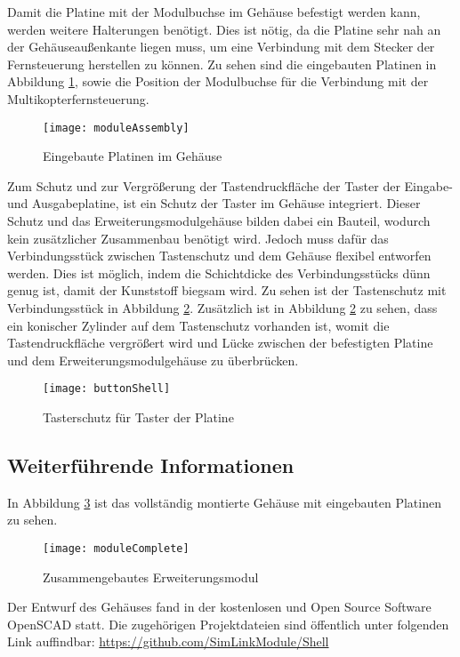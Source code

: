 Damit die Platine mit der Modulbuchse im Gehäuse befestigt werden kann, werden weitere Halterungen benötigt. Dies ist nötig, da die Platine sehr nah an der Gehäuseaußenkante liegen muss, um eine Verbindung mit dem Stecker der Fernsteuerung herstellen zu können. Zu sehen sind die eingebauten Platinen in Abbildung \ref{fig:moduleAssembly}, sowie die Position der Modulbuchse für die Verbindung mit der Multikopterfernsteuerung.

\begin{figure}[h]
    \centering
    \texttt{[image: moduleAssembly]}
    \caption{Eingebaute Platinen im Gehäuse}
    \label{fig:moduleAssembly}
\end{figure}

Zum Schutz und zur Vergrößerung der Tastendruckfläche der Taster der Eingabe- und Ausgabeplatine, ist ein Schutz der Taster im Gehäuse integriert. Dieser Schutz und das Erweiterungsmodulgehäuse bilden dabei ein Bauteil, wodurch kein zusätzlicher Zusammenbau benötigt wird. Jedoch muss dafür das Verbindungsstück zwischen Tastenschutz und dem Gehäuse flexibel entworfen werden. Dies ist möglich, indem die Schichtdicke des Verbindungsstücks dünn genug ist, damit der Kunststoff biegsam wird. Zu sehen ist der Tastenschutz mit Verbindungsstück in Abbildung \ref{fig:buttonShell}. Zusätzlich ist in Abbildung \ref{fig:buttonShell} zu sehen, dass ein konischer Zylinder auf dem Tastenschutz vorhanden ist, womit die Tastendruckfläche vergrößert wird und Lücke zwischen der befestigten Platine und dem Erweiterungsmodulgehäuse zu überbrücken.

\begin{figure}[h]
    \centering
    \texttt{[image: buttonShell]}
    \caption{Tasterschutz für Taster der Platine}
    \label{fig:buttonShell}
\end{figure}

\subsection{Weiterführende Informationen}
In Abbildung \ref{fig:moduleComplete} ist das vollständig montierte Gehäuse mit eingebauten Platinen zu sehen.

\begin{figure}[h]
    \centering
    \texttt{[image: moduleComplete]}
    \caption{Zusammengebautes Erweiterungsmodul}
    \label{fig:moduleComplete}
\end{figure}

Der Entwurf des Gehäuses fand in der kostenlosen und Open Source Software OpenSCAD \cite{aboutOpenScad} statt. Die zugehörigen Projektdateien sind öffentlich unter folgenden Link auffindbar: \url{https://github.com/SimLinkModule/Shell}